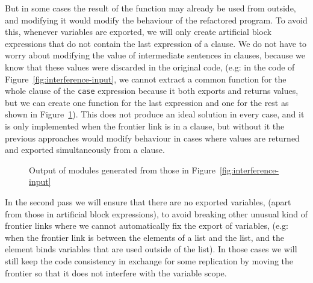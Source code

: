 But in some cases the result of the function may already be used from
outside, and modifying it would modify the behaviour of the refactored
program. To avoid this, whenever variables are exported, we will only
create artificial block expressions that do not contain the last expression
of a clause. We do not have to worry about modifying the value of
intermediate sentences in clauses, because we know that these values
were discarded in the original code, (e.g: in the code of 
Figure~\ref{fig:interference-input},
we cannot extract a common function for the whole clause of the \texttt{case}
expression because it both exports and returns values, but we can
create one function for the last expression and one for the rest as
shown in Figure~\ref{fig:interference-output}). This does not produce an ideal 
solution in every
case, and it is only implemented when the frontier link is in a clause,
but without it the previous approaches would modify behaviour in cases
where values are returned and exported simultaneously from a clause.

\begin{figure}
\begin{minipage}[t]{1\textwidth}%
%
\end{minipage}

\begin{minipage}[t]{1\textwidth}%
%
\end{minipage}

\begin{minipage}[t]{1\textwidth}%
%
\end{minipage}
\vspace*{-2.5mm}
\caption{Output of modules generated from those in 
Figure~\ref{fig:interference-input}\label{fig:interference-output}}
\end{figure}


In the second pass we will ensure that there are no exported variables,
(apart from those in artificial block expressions), to avoid breaking
other unusual kind of frontier links where we cannot automatically fix
the export of variables, (e.g: when the frontier link is between
the elements of a list and the list, and the element binds variables that
are used outside of the list). In those cases we will still keep the code
consistency in exchange for some replication by moving the frontier so that
it does not interfere with the variable scope.

